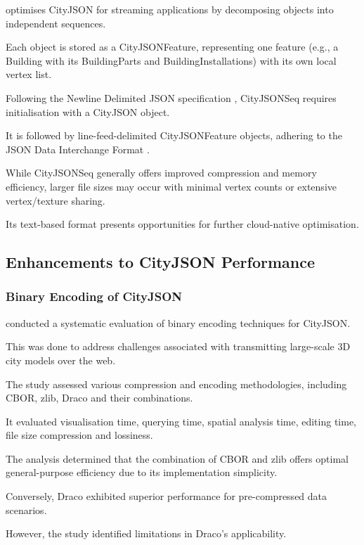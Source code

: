 \citet{ledoux_2024} optimises CityJSON for streaming applications by decomposing objects into independent sequences.

Each object is stored as a CityJSONFeature, representing one feature (e.g., a Building with its BuildingParts and BuildingInstallations) with its own local vertex list.

Following the Newline Delimited JSON specification \citep{jsonnd}, CityJSONSeq requires initialisation with a CityJSON object.

It is followed by line-feed-delimited CityJSONFeature objects, adhering to the JSON Data Interchange Format \citep{json_data_interchange_format}.

While CityJSONSeq generally offers improved compression and memory efficiency, larger file sizes may occur with minimal vertex counts or extensive vertex/texture sharing.

Its text-based format presents opportunities for further cloud-native optimisation.

\subsection{Enhancements to CityJSON Performance}
\label{rw:cityjson_enhancements:performance}

\subsubsection{Binary Encoding of CityJSON}
\label{rw:cityjson_enhancements:performance:binary_encoding}

\citet{jordi_van_liempt_2020} conducted a systematic evaluation of binary encoding techniques for CityJSON.

This was done to address challenges associated with transmitting large-scale 3D city models over the web.

The study assessed various compression and encoding methodologies, including CBOR, zlib, Draco and their combinations.

It evaluated visualisation time, querying time, spatial analysis time, editing time, file size compression and lossiness.

The analysis determined that the combination of CBOR and zlib offers optimal general-purpose efficiency due to its implementation simplicity.

Conversely, Draco exhibited superior performance for pre-compressed data scenarios.

However, the study identified limitations in Draco's applicability.

